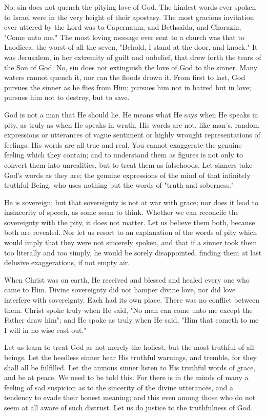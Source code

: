 \documentclass[
]{book}
\begin{document}
No; sin does not quench the pitying love of God. The kindest words ever spoken to Israel were in the very height of their apostasy. The most gracious invitation ever uttered by the Lord was to Capernaum, and Bethsaida, and Chorazin, "Come unto me." The most loving message ever sent to a church was that to Laodicea, the worst of all the seven, "Behold, I stand at the door, and knock." It was Jerusalem, in her extremity of guilt and unbelief, that drew forth the tears of the Son of God. No, sin does not extinguish the love of God to the sinner. Many waters cannot quench it, nor can the floods drown it. From first to last, God pursues the sinner as he flies from Him; pursues him not in hatred but in love; pursues him not to destroy, but to save.

God is not a man that He should lie. He means what He says when He speaks in pity, as truly as when He speaks in wrath. His words are not, like man's, random expressions or utterances of vague sentiment or highly wrought representations of feelings. His words are all true and real. You cannot exaggerate the genuine feeling which they contain; and to understand them as figures is not only to convert them into unrealities, but to treat them as falsehoods. Let sinners take God's words as they are; the genuine expressions of the mind of that infinitely truthful Being, who uses nothing but the words of "truth and soberness."

He is sovereign; but that sovereignty is not at war with grace; nor does it lead to insincerity of speech, as some seem to think. Whether we can reconcile the sovereignty with the pity, it does not matter. Let us believe them both, because both are revealed. Nor let us resort to an explanation of the words of pity which would imply that they were not sincerely spoken, and that if a sinner took them too literally and too simply, he would be sorely disappointed, finding them at last delusive exaggerations, if not empty air.

When Christ was on earth, He received and blessed and healed every one who came to Him. Divine sovereignty did not hamper divine love, nor did love interfere with sovereignty. Each had its own place. There was no conflict between them. Christ spoke truly when He said, "No man can come unto me except the Father draw him"; and He spoke as truly when He said, "Him that cometh to me I will in no wise cast out."

Let us learn to treat God as not merely the holiest, but the most truthful of all beings. Let the heedless sinner hear His truthful warnings, and tremble, for they shall all be fulfilled. Let the anxious sinner listen to His truthful words of grace, and be at peace. We need to be told this. For there is in the minds of many a feeling of sad suspicion as to the sincerity of the divine utterances, and a tendency to evade their honest meaning; and this even among those who do not seem at all aware of such distrust. Let us do justice to the truthfulness of God.
\end{document}
